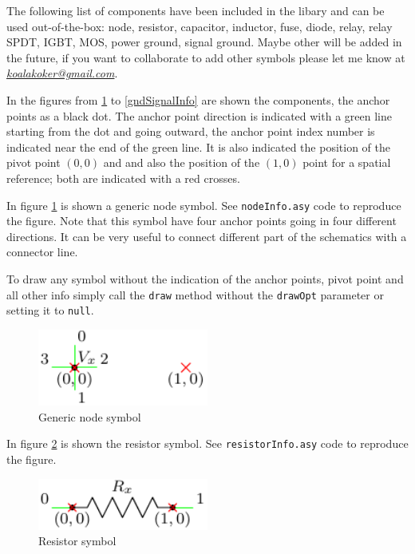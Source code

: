 \documentclass[a4paper,12pt]{report}
\begin{document}
The following list of components have been included in the libary and can be used out-of-the-box: node, resistor, capacitor, inductor, fuse, diode, relay, relay SPDT, IGBT, MOS, power ground, signal ground. Maybe other will be added in the future, if you want to collaborate to add other symbols please let me know at \emph{\href{mailto:koalakoker@gmail.com}{koalakoker@gmail.com}}.

In the figures from \ref{nodeInfo} to \ref{gndSignalInfo} are shown the components, the anchor points as a black dot. The anchor point direction is indicated with a green line starting from the dot and going outward, the anchor point index number is indicated near the end of the green line. It is also indicated the position of the pivot point $(0,0)$ and and also the position of the $(1,0)$ point for a spatial reference; both are indicated with a red crosses.

In figure \ref{nodeInfo} is shown a generic node symbol. See \texttt{nodeInfo.asy} code to reproduce the figure. Note that this symbol have four anchor points going in four different directions. It can be very useful to connect different part of the schematics with a connector line.

To draw any symbol without the indication of the anchor points, pivot point and all other info simply call the \texttt{draw} method without the \texttt{drawOpt} parameter or setting it to \texttt{null}.   

\begin{figure}[ht]
\centering
\includegraphics[width=0.5\textwidth]{nodeInfo}
\caption{Generic node symbol}
\label{nodeInfo}
\end{figure}

In figure \ref{resistorInfo} is shown the resistor symbol. See \texttt{resistorInfo.asy} code to reproduce the figure.

\begin{figure}[ht]
\centering
\includegraphics[width=0.5\textwidth]{resistorInfo}
\caption{Resistor symbol}
\label{resistorInfo}
\end{figure}
\end{document}
